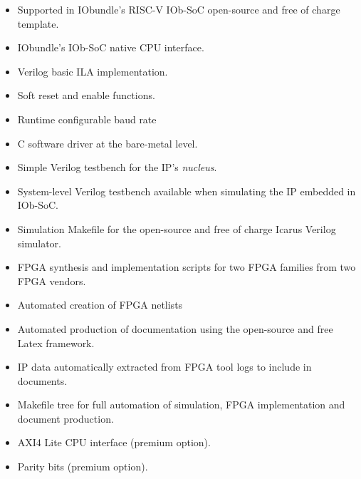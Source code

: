 \begin{itemize}
\item Supported in IObundle's RISC-V IOb-SoC open-source and free of charge template.
\item IObundle's IOb-SoC native CPU interface.
\item Verilog basic ILA implementation.
\item Soft reset and enable functions.
\item Runtime configurable baud rate
\item C software driver at the bare-metal level.
\item Simple Verilog testbench for the IP's {\em nucleus}.
\item System-level Verilog testbench available when simulating the IP embedded in IOb-SoC.
\item Simulation Makefile for the open-source and free of charge Icarus Verilog simulator.
\item FPGA synthesis and implementation scripts for two FPGA families from two FPGA vendors.
\item Automated creation of FPGA netlists
\item Automated production of documentation using the open-source and free Latex framework.
\item IP data automatically extracted from FPGA tool logs to include in documents.
\item Makefile tree for full automation of simulation, FPGA implementation and document production.
\item AXI4 Lite CPU interface (premium option).
\item Parity bits  (premium option).
\end{itemize}
